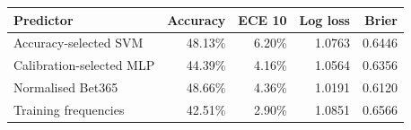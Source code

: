 \begin{tabularx}{\linewidth}{@{}Yrrrr@{}}
\toprule
Predictor & Accuracy & ECE 10 & Log loss & Brier \\

\midrule
Accuracy-selected SVM & 48.13\% & 6.20\% & 1.0763 & 0.6446 \\
Calibration-selected MLP & 44.39\% & 4.16\% & 1.0564 & 0.6356 \\
Normalised Bet365 & 48.66\% & 4.36\% & 1.0191 & 0.6120 \\
Training frequencies & 42.51\% & 2.90\% & 1.0851 & 0.6566 \\
\bottomrule
\end{tabularx}
